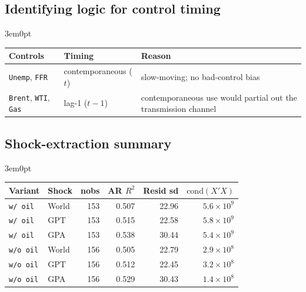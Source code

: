 \documentclass[12pt]{article}
\newenvironment{bodyL2}{\begin{adjustwidth}{3em}{0pt}}{\end{adjustwidth}}
\begin{document}
\subsection{Identifying logic for control timing}
\begin{bodyL2}
\begin{center}
\renewcommand{\arraystretch}{1.2}
\begin{tabular}{llp{2.6in}}
\toprule
Controls & Timing & Reason \\
\midrule
\texttt{Unemp}, \texttt{FFR}                & contemporaneous ($t$) & slow-moving; no bad-control bias \\
\texttt{Brent}, \texttt{WTI}, \texttt{Gas}  & lag-1 ($t-1$)         & contemporaneous use would partial out the transmission channel \\
\bottomrule
\end{tabular}
\end{center}
\end{bodyL2}

\subsection{Shock-extraction summary}
\begin{bodyL2}
\begin{center}
\begin{tabular}{llrrrr}
\toprule
Variant          & Shock & nobs & AR $R^2$ & Resid sd & $\mathrm{cond}(X'X)$ \\
\midrule
\texttt{w/ oil}    & World & 153 & 0.507 & 22.96 & $5.6 \times 10^{9}$ \\
\texttt{w/ oil}    & GPT   & 153 & 0.515 & 22.58 & $5.8 \times 10^{9}$ \\
\texttt{w/ oil}    & GPA   & 153 & 0.538 & 30.44 & $5.4 \times 10^{9}$ \\
\midrule
\texttt{w/o oil} & World & 156 & 0.505 & 22.79 & $2.9 \times 10^{8}$ \\
\texttt{w/o oil} & GPT   & 156 & 0.512 & 22.45 & $3.2 \times 10^{8}$ \\
\texttt{w/o oil} & GPA   & 156 & 0.529 & 30.43 & $1.4 \times 10^{8}$ \\
\bottomrule
\end{tabular}
\end{center}
\end{bodyL2}
\end{document}
